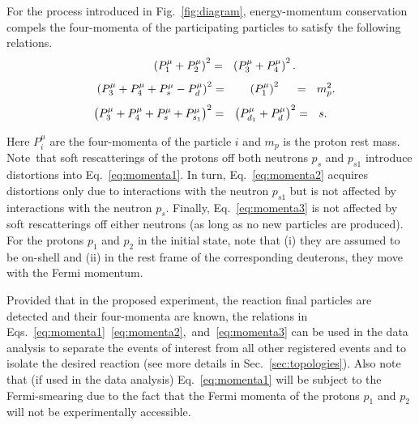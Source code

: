 For the process introduced in Fig.~\ref{fig:diagram}, energy-momentum conservation compels the four-momenta of the participating particles to satisfy the following relations. 
\begin{equation}
\enspace \enspace \enspace  \enspace \enspace\left( P_{1}^{\mu}+P_{2}^{\mu} \right)^2 =~~\left( P_{3}^{\mu}+P_{4}^{\mu} \right)^2.\\
\label{eq:momenta1}
\end{equation}
\begin{equation}
~~~\left( P_{3}^{\mu}+P_{4}^{\mu}+P_{s}^{\mu} -P_{d}^{\mu} \right)^2 =~~~~~~\left(P_{1}^{\mu} \right)^2~~~~ =~~m_{p}^{2}.\\
\label{eq:momenta2}
\end{equation}
\begin{equation}
\left( P_{3}^{\mu}+P_{4}^{\mu}+P_{s}^{\mu} + P_{s_{1}}^{\mu} \right)^2 =~~\left( P_{d_{1}}^{\mu}+P_{d}^{\mu} \right)^2=~~s.\\
\label{eq:momenta3}
\end{equation}




Here $P_{i}^{\mu}$ are the four-momenta of the particle $i$ and $m_{p}$ is the proton rest mass. Note~that soft rescatterings of the protons off both neutrons $p_{s}$ and $p_{s1}$ introduce distortions into Eq.~\eqref{eq:momenta1}. In turn, Eq.~\eqref{eq:momenta2} acquires distortions only due to interactions with the neutron $p_{s1}$ but is not affected by interactions with the neutron $p_{s}$. Finally, Eq.~\eqref{eq:momenta3} is not affected by soft rescatterings off either neutrons (as long as no new particles are produced). For the protons $p_{1}$ and $p_{2}$ in the initial state, note that (i) they are assumed to be on-shell and (ii) in the rest frame of the corresponding deuterons, they move with the Fermi momentum.



Provided that in the proposed experiment, the reaction final particles are detected and their four-momenta are known, the relations in Eqs.~\eqref{eq:momenta1}~\eqref{eq:momenta2},~and~\eqref{eq:momenta3} can be used in the data analysis to separate the events of interest from all other registered events and to isolate the desired reaction (see more details in Sec.~\ref{sec:topologies}). Also note that (if used in the data analysis) Eq.~\eqref{eq:momenta1} will be subject to the Fermi-smearing due to the fact that the Fermi momenta of the protons $p_{1}$ and $p_{2}$ will not be experimentally accessible. 



